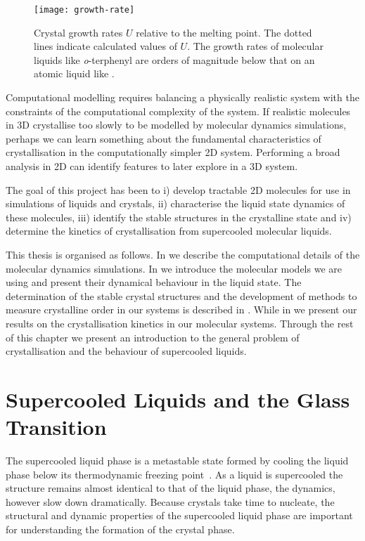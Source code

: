 \begin{figure}
    \centering
    \texttt{[image: growth-rate]}
    \caption{Crystal growth rates $U$ relative to the melting point. The dotted lines indicate calculated values of $U$. The growth rates of molecular liquids like {\em o}-terphenyl are orders of magnitude below that on an atomic liquid like .}
    \label{fig:growth rate}
\end{figure}

Computational modelling requires balancing a physically realistic system with the constraints of the computational complexity of the system. If realistic molecules in 3D crystallise too slowly to be modelled by molecular dynamics simulations, perhaps we can learn something about the fundamental characteristics of crystallisation in the computationally simpler 2D system. Performing a broad analysis in 2D can identify features to later explore in a 3D system.

The goal of this project has been to i) develop tractable 2D molecules for use in simulations of liquids and crystals, ii) characterise the liquid state dynamics of these molecules, iii) identify the stable structures in the crystalline state and iv) determine the kinetics of crystallisation from supercooled molecular liquids.

This thesis is organised as follows. In  we describe the computational details of the molecular dynamics simulations. In  we introduce the molecular models we are using and present their dynamical behaviour in the liquid state. The determination of the stable crystal structures and the development of methods to measure crystalline order in our systems is described in . While in  we present our results on the crystallisation kinetics in our molecular systems. Through the rest of this chapter we present an introduction to the general problem of crystallisation and the behaviour of supercooled liquids.

\section{Supercooled Liquids and the Glass Transition}

The supercooled liquid phase is a metastable state formed by cooling the liquid phase below its thermodynamic freezing point~\cite{cavagna:09}. As a liquid is supercooled the structure remains almost identical to that of the liquid phase, the dynamics, however slow down dramatically. Because crystals take time to nucleate, the structural and dynamic properties of the supercooled liquid phase are important for understanding the formation of the crystal phase.

